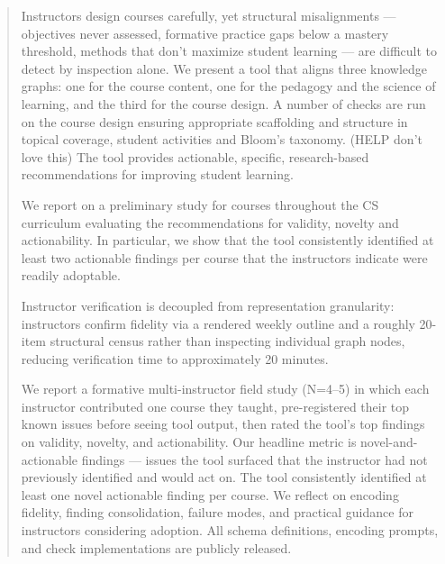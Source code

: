 \documentclass[sigconf,review]{acmart}
\begin{document}
\begin{abstract}
Instructors design courses carefully, yet structural misalignments — objectives never assessed, formative practice gaps below a mastery threshold, methods that don't maximize
student learning — are difficult to detect by inspection alone. We present a tool that aligns
three knowledge graphs:  one for the course content, one for the pedagogy and the science of learning, and the third for the course design.  A number of checks are run on the course
design ensuring appropriate scaffolding and structure in topical coverage, student activities and Bloom's taxonomy.  (HELP don't love this)  The tool provides
actionable, specific, research-based recommendations for improving student learning.

We report on a preliminary study for courses throughout the CS curriculum evaluating the recommendations for validity, novelty
and actionability.  In particular, we show that the tool consistently identified at least two actionable findings per course that the instructors indicate were readily adoptable.




Instructor verification is decoupled from representation granularity: instructors confirm fidelity via a rendered weekly outline and a roughly 20-item structural census rather than inspecting individual graph nodes, reducing verification time to approximately 20 minutes.

We report a formative multi-instructor field study (N=4–5) in which each instructor contributed one course they taught, pre-registered their top known issues before seeing tool output, then rated the tool's top findings on validity, novelty, and actionability. Our headline metric is novel-and-actionable findings — issues the tool surfaced that the instructor had not previously identified and would act on. The tool consistently identified at least one novel actionable finding per course. We reflect on encoding fidelity, finding consolidation, failure modes, and practical guidance for instructors considering adoption. All schema definitions, encoding prompts, and check implementations are publicly released.
	

\end{abstract}
\end{document}
